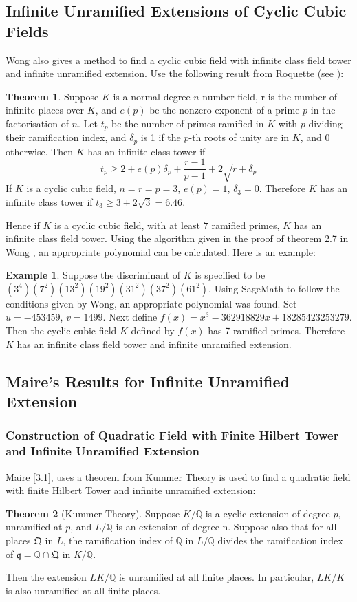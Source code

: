 \documentclass[12pt]{extarticle}
\newcommand{\Q}{\mathbb{Q}}
\newcommand{\<}{\langle}
\renewcommand{\>}{\rangle}
\theoremstyle{definition}
\newtheorem{theorem}{Theorem}
\newtheorem{example}{Example}
\begin{document}
\subsection{Infinite Unramified Extensions of Cyclic Cubic Fields }
Wong also gives a method to find a cyclic cubic field with infinite class field tower and infinite unramified extension. Use the following result from Roquette (see \cite{Koch}):
\begin{theorem}
    Suppose $K$ is a normal degree $n$ number field, r is the number of infinite places over $K$, and $e(p)$ be the nonzero exponent of a prime $p$ in the factorisation of $n$. Let $t_p$ be the number of primes ramified in $K$ with $p$ dividing their ramification index, and $\delta_p$ is 1 if the $p$-th roots of unity are in $K$, and 0 otherwise. Then $K$ has an infinite class tower if \begin{equation}
        t_p\geqslant 2 + e(p)\delta_p + \frac{r-1}{p-1} + 2 \sqrt{r+\delta_p} 
    \end{equation}
 If $K$ is a cyclic cubic field, $n=r=p=3$, $e(p)=1$, $\delta_3 = 0$. Therefore $K$ has an infinite class tower if $t_3 \geq 3 + 2\sqrt{3} = 6.46$. 
\end{theorem}
Hence if $K$ is a cyclic cubic field, with at least $7$ ramified primes, $K$ has an infinite class field tower. Using the algorithm given in the proof of theorem 2.7 in Wong \cite{WONG}, an appropriate polynomial can be calculated. Here is an example:
\begin{example}
    Suppose the discriminant of $K$ is specified to be $(3^4)(7^2)(13^2)(19^2)(31^2)(37^2)(61^2)$. Using SageMath to follow the conditions given by Wong, an appropriate polynomial was found. Set $u = -453459$, $v=1499$. Next define $f(x) = x^3-362918829x + 18285423253279$. Then the cyclic cubic field $K$ defined by $f(x)$ has 7 ramified primes. Therefore $K$ has an infinite class field tower and infinite unramified extension. 
\end{example}




\subsection{Maire's Results for Infinite Unramified Extension}
\subsubsection*{Construction of Quadratic Field with Finite Hilbert Tower and Infinite Unramified Extension}
Maire \cite{MAIR}[3.1], uses a theorem from Kummer Theory is used to find a quadratic field with finite Hilbert Tower and infinite unramified extension:
\begin{theorem}[Kummer Theory]
\label{thm:Kummer}
Suppose $K/\Q$ is a cyclic extension of degree $p$, unramified at $p$, and $L/\Q$ is an extension of degree n. Suppose also that for all places $\mathfrak{Q}$ in $L$, the ramification index of $\Q$ in $L/\Q$ divides the ramification index of $\mathfrak{q} = \Q\cap\mathfrak{Q}$ in $K/\Q$. \par
Then the extension $LK/\Q$ is unramified at all finite places. In particular, $\bar{L}K/K$ is also unramified at all finite places.
\end{theorem}
\end{document}
